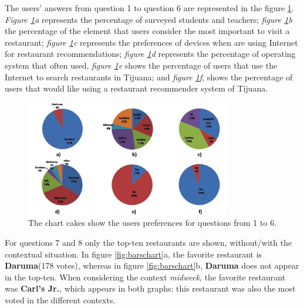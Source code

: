 The users' answers from question 1 to question 6 are represented in
the figure \ref{fig:cakeschart}. \textit{Figure \ref{fig:cakeschart}a}
represents the percentage of surveyed students and teachers;
\textit{figure \ref{fig:cakeschart}b}  the percentage of the element
that users consider the most important to visit a restaurant;
\textit{figure \ref{fig:cakeschart}c} represents the preferences of
devices when are using Internet for restaurant recommendations;
\textit{figure \ref{fig:cakeschart}d} represents the percentage of
operating system that often used, \textit{figure
\ref{fig:cakeschart}e} shows the percentage of users that use the
Internet to search restaurants in Tijuana; and \textit{figure
\ref{fig:cakeschart}f}, shows the percentage of users that would like
using a restaurant recommender system of Tijuana.
\begin{figure}
\captionsetup{justification=centering,margin=2cm,font=footnotesize}
\centering
\setlength\fboxsep{0pt}
\includegraphics[width=0.8\textwidth]{img/cakes.png}
\caption{The chart cakes show the users preferences for questions from 1 to 6.}
\label{fig:cakeschart}     
\end{figure}
For questions 7 and 8 only the top-ten restaurants are shown,
without/with the contextual situation. In figure \ref{fig:barschart}a,
the favorite restaurant is \textbf{Daruma}(178 votes),  whereas in
figure \ref{fig:barschart}b, \textbf{Daruma} does not appear in the
top-ten. When considering the context \textit{midweek}, the favorite
restaurant was \textbf{Carl's Jr.}, which appears in both graphs; this
restaurant was also the most voted in the different contexts.
